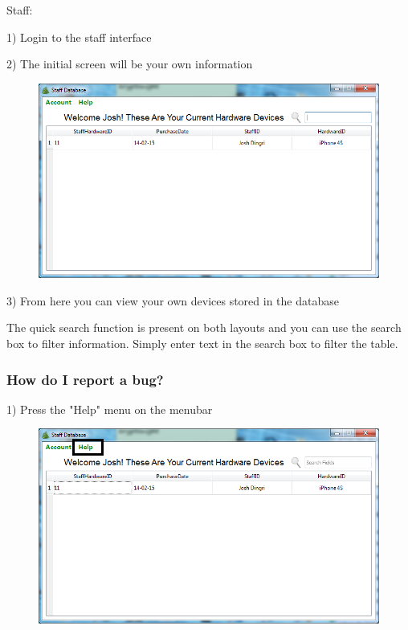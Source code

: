 Staff:

1) Login to the staff interface

2) The initial screen will be your own information

\begin{figure}[H]
    \includegraphics[width=\textwidth]{./Manual/Images/myinfostaff.png}
\end{figure}

3) From here you can view your own devices stored in the database

The quick search function is present on both layouts and you can use the search box to filter information. Simply enter text in the search box to filter the table.

\subsubsection{How do I report a bug?}

1) Press the "Help" menu on the menubar

\begin{figure}[H]
    \includegraphics[width=\textwidth]{./Manual/Images/bugreport.png}
\end{figure}

